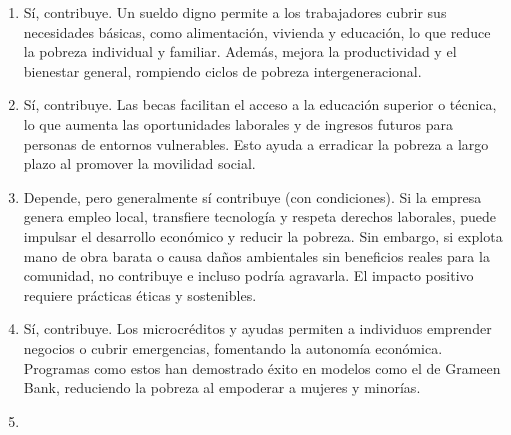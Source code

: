 
\begin{solution}

	\begin{enumerate}[label=\alph*)]
		\item{}
			\vspace{0,5em}

		Sí, contribuye. Un sueldo digno permite a los trabajadores cubrir sus necesidades básicas, como alimentación, vivienda y 
		educación, lo que reduce la pobreza individual y familiar. Además, mejora la productividad y el bienestar general, 
		rompiendo ciclos de pobreza intergeneracional.

			\vspace{0,5em}
		\item{}
			\vspace{0,5em}
			
		Sí, contribuye. Las becas facilitan el acceso a la educación superior o técnica, lo que aumenta las oportunidades 
		laborales y de ingresos futuros para personas de entornos vulnerables. Esto ayuda a erradicar la pobreza a largo 
		plazo al promover la movilidad social.
			\vspace{0,5em}
		\item{}
			\vspace{0,5em}

		Depende, pero generalmente sí contribuye (con condiciones). Si la empresa genera empleo local, transfiere tecnología y 
		respeta derechos laborales, puede impulsar el desarrollo económico y reducir la pobreza. Sin embargo, si explota mano 
		de obra barata o causa daños ambientales sin beneficios reales para la comunidad, no contribuye e incluso podría agravarla. 
		El impacto positivo requiere prácticas éticas y sostenibles.

			\vspace{0,5em}
		\item{}
			\vspace{0,5em}

			Sí, contribuye. Los microcréditos y ayudas permiten a individuos emprender negocios o cubrir emergencias,
			fomentando la autonomía económica. Programas como estos han demostrado éxito en modelos como el de Grameen Bank,
			reduciendo la pobreza al empoderar a mujeres y minorías.
			\vspace{0,5em}
		\item{}
			\vspace{0,5em}


\end{enumerate}
\end{solution}
